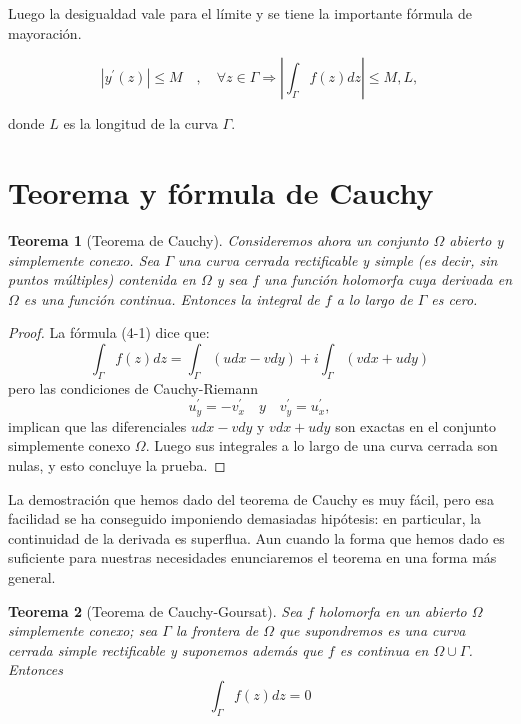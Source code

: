 \documentclass[10pt]{article}
\theoremstyle{plain}
\newtheorem{theorem}{Teorema}[section]
\theoremstyle{definition}
\theoremstyle{remark}
\begin{document}
Luego la desigualdad vale para el límite y se tiene la importante fórmula de mayoración.


\begin{equation*}
\left|y^{\prime}(z)\right| \leqslant M \quad, \quad \forall z \in \Gamma \Rightarrow\left|\int_{\Gamma} f(z) d z\right| \leqslant M, L, \tag{$4\cdot3$}
\end{equation*}


donde $L$ es la longitud de la curva $\Gamma$.

\section{Teorema y fórmula de Cauchy}

\begin{theorem}[Teorema de Cauchy]
Consideremos ahora un conjunto $\Omega$ abierto y simplemente conexo. Sea $\Gamma$ una curva cerrada rectificable y simple (es decir, sin puntos múltiples) contenida en $\Omega$ y sea $f$ una función holomorfa cuya derivada en $\Omega$ es una función continua. Entonces la integral de $f$ a lo largo de $\Gamma$ es cero.
\end{theorem}

\begin{proof}
La fórmula (4-1) dice que:
$$\int_{\Gamma} f(z) d z=\int_{\Gamma}(u d x-v d y)+i \int_{\Gamma}(v d x+u d y)$$
pero las condiciones de Cauchy-Riemann
$$u_{y}^{\prime}=-v_{x}^{\prime} \quad y \quad v_{y}^{\prime}=u_{x}^{\prime},$$
implican que las diferenciales $u d x-v d y$ y $v d x+u d y$ son exactas en el conjunto simplemente conexo $\Omega$. Luego sus integrales a lo largo de una curva cerrada son nulas, y esto concluye la prueba.
\end{proof}

La demostración que hemos dado del teorema de Cauchy es muy fácil, pero esa facilidad se ha conseguido imponiendo demasiadas hipótesis: en particular, la continuidad de la derivada es superflua. Aun cuando la forma que hemos dado es suficiente para nuestras necesidades enunciaremos el teorema en una forma más general.

\begin{theorem}[Teorema de Cauchy-Goursat]
Sea $f$ holomorfa en un abierto $\Omega$ simplemente conexo; sea $\Gamma$ la frontera de $\Omega$ que supondremos es una curva cerrada simple rectificable y suponemos además que $f$ es continua en $\Omega \cup \Gamma$. Entonces
$$\int_{\Gamma} f(z) d z=0$$
\end{theorem}
\end{document}
